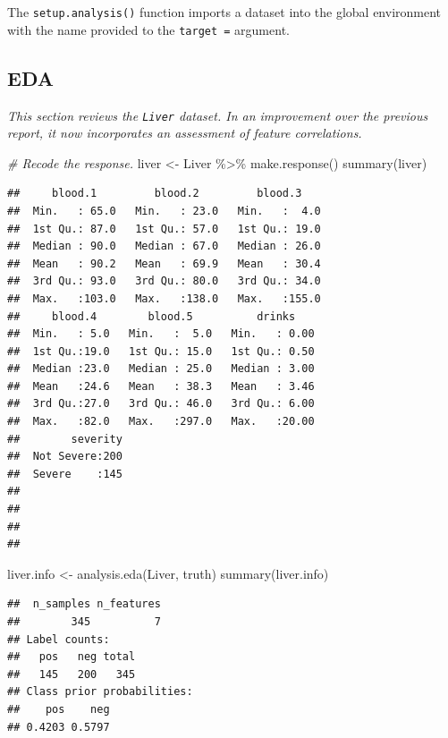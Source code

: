 \documentclass[
  11pt,
  a4paper,
]{scrartcl}
\newenvironment{Shaded}{\begin{snugshade}}{\end{snugshade}}
\newcommand{\CommentTok}[1]{\textcolor[rgb]{0.56,0.35,0.01}{\textit{#1}}}
\newcommand{\FunctionTok}[1]{\textcolor[rgb]{0.00,0.00,0.00}{#1}}
\newcommand{\NormalTok}[1]{#1}
\newcommand{\OtherTok}[1]{\textcolor[rgb]{0.56,0.35,0.01}{#1}}
\newcommand{\SpecialCharTok}[1]{\textcolor[rgb]{0.00,0.00,0.00}{#1}}
\begin{document}
The \texttt{setup.analysis()} function imports a dataset into the global
environment with the name provided to the \texttt{target\ =} argument.

\hypertarget{eda}{%
\subsection{EDA}\label{eda}}

\emph{This section reviews the \texttt{Liver} dataset. In an improvement
over the previous report, it now incorporates an assessment of feature
correlations.}

\begin{Shaded}
\begin{Highlighting}[]
\CommentTok{\# Recode the response.}
\NormalTok{liver }\OtherTok{\textless{}{-}}\NormalTok{ Liver }\SpecialCharTok{\%\textgreater{}\%} \FunctionTok{make.response}\NormalTok{()}
\FunctionTok{summary}\NormalTok{(liver)}
\end{Highlighting}
\end{Shaded}

\begin{verbatim}
##     blood.1         blood.2         blood.3     
##  Min.   : 65.0   Min.   : 23.0   Min.   :  4.0  
##  1st Qu.: 87.0   1st Qu.: 57.0   1st Qu.: 19.0  
##  Median : 90.0   Median : 67.0   Median : 26.0  
##  Mean   : 90.2   Mean   : 69.9   Mean   : 30.4  
##  3rd Qu.: 93.0   3rd Qu.: 80.0   3rd Qu.: 34.0  
##  Max.   :103.0   Max.   :138.0   Max.   :155.0  
##     blood.4        blood.5          drinks     
##  Min.   : 5.0   Min.   :  5.0   Min.   : 0.00  
##  1st Qu.:19.0   1st Qu.: 15.0   1st Qu.: 0.50  
##  Median :23.0   Median : 25.0   Median : 3.00  
##  Mean   :24.6   Mean   : 38.3   Mean   : 3.46  
##  3rd Qu.:27.0   3rd Qu.: 46.0   3rd Qu.: 6.00  
##  Max.   :82.0   Max.   :297.0   Max.   :20.00  
##        severity  
##  Not Severe:200  
##  Severe    :145  
##                  
##                  
##                  
## 
\end{verbatim}

\begin{Shaded}
\begin{Highlighting}[]
\NormalTok{liver.info }\OtherTok{\textless{}{-}} \FunctionTok{analysis.eda}\NormalTok{(Liver, truth)}
\FunctionTok{summary}\NormalTok{(liver.info)}
\end{Highlighting}
\end{Shaded}

\begin{verbatim}
##  n_samples n_features 
##        345          7 
## Label counts: 
##   pos   neg total 
##   145   200   345 
## Class prior probabilities: 
##    pos    neg 
## 0.4203 0.5797
\end{verbatim}
\end{document}

